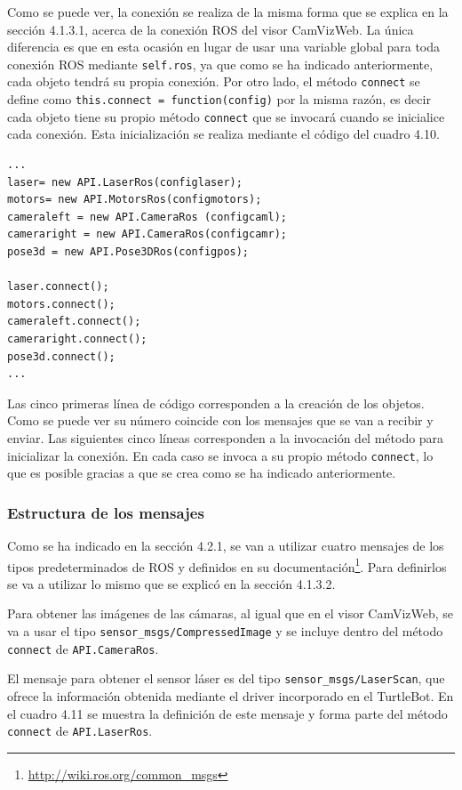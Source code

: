 Como se puede ver, la conexión se realiza de la misma forma que se explica en la sección 4.1.3.1, acerca de la conexión ROS del visor CamVizWeb. La única diferencia es que en esta ocasión en lugar de usar una variable global para toda conexión ROS mediante \texttt{self.ros}, ya que como se ha indicado anteriormente, cada objeto tendrá su propia conexión. Por otro lado, el método \texttt{connect} se define como \texttt{this.connect = function(config)} por la misma razón, es decir cada objeto tiene su propio método \texttt{connect} que se invocará cuando se inicialice cada conexión. Esta inicialización se realiza mediante el código del cuadro 4.10.

\begin{lstlisting}[caption= Creación de cada uno de los objetos de la \textit{API} y su posterior inicialización, label=cod.objetoapiTurtleBot]
...
laser= new API.LaserRos(configlaser);
motors= new API.MotorsRos(configmotors);
cameraleft = new API.CameraRos (configcaml);
cameraright = new API.CameraRos(configcamr);
pose3d = new API.Pose3DRos(configpos);
    
laser.connect();
motors.connect();
cameraleft.connect();
cameraright.connect();
pose3d.connect();
...
\end{lstlisting}
Las cinco primeras línea de código corresponden a la creación de los objetos. Como se puede ver su número coincide con los mensajes que se van a recibir y enviar. Las siguientes cinco líneas corresponden a la invocación del método para inicializar la conexión. En cada caso se invoca a su propio método \texttt{connect}, lo que es posible gracias a que se crea como se ha indicado anteriormente.

\subsubsection{Estructura de los mensajes}
Como se ha indicado en la sección 4.2.1, se van a utilizar cuatro mensajes de los tipos predeterminados de ROS y definidos en su documentación\footnote{\url{http://wiki.ros.org/common_msgs}}. Para definirlos se va a utilizar lo mismo que se explicó en la sección 4.1.3.2.

Para obtener las imágenes de las cámaras, al igual que en el visor CamVizWeb, se va a usar el tipo \texttt{sensor\_msgs/CompressedImage} y se incluye dentro del método \texttt{connect} de \texttt{API.CameraRos}.

El mensaje para obtener el sensor láser es del tipo \texttt{sensor\_msgs/LaserScan}, que ofrece la información obtenida mediante el driver incorporado en el TurtleBot. En el cuadro 4.11 se muestra la definición de este mensaje y forma parte del método \texttt{connect} de \texttt{API.LaserRos}.

